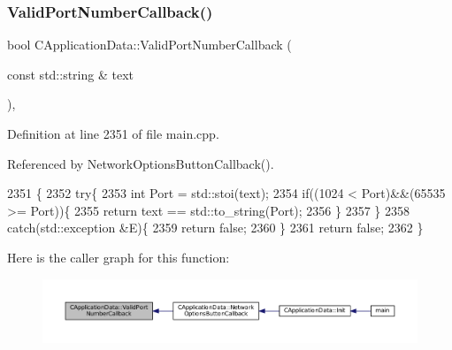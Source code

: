 \subsubsection{\texorpdfstring{Valid\+Port\+Number\+Callback()}{ValidPortNumberCallback()}}
{\footnotesize\ttfamily bool C\+Application\+Data\+::\+Valid\+Port\+Number\+Callback (\begin{DoxyParamCaption}\item[{const std\+::string \&}]{text }\end{DoxyParamCaption})\hspace{0.3cm}{\ttfamily [static]}, {\ttfamily [protected]}}



Definition at line 2351 of file main.\+cpp.



Referenced by Network\+Options\+Button\+Callback().


\begin{DoxyCode}
2351                                                                    \{
2352     \textcolor{keywordflow}{try}\{
2353         \textcolor{keywordtype}{int} Port = std::stoi(text);
2354         \textcolor{keywordflow}{if}((1024 < Port)&&(65535 >= Port))\{
2355             \textcolor{keywordflow}{return} text == std::to\_string(Port);
2356         \}
2357     \}
2358     \textcolor{keywordflow}{catch}(std::exception &E)\{
2359         \textcolor{keywordflow}{return} \textcolor{keyword}{false};
2360     \}
2361     \textcolor{keywordflow}{return} \textcolor{keyword}{false};
2362 \}
\end{DoxyCode}
Here is the caller graph for this function\+:\nopagebreak
\begin{figure}[H]
\begin{center}
\leavevmode
\includegraphics[width=350pt]{classCApplicationData_adc8125cc7c4ad01bdd43e6550c6ba133_icgraph}
\end{center}
\end{figure}
\hypertarget{classCApplicationData_ae3216a4fccd68c9657d7e936b1a6df67}{}\label{classCApplicationData_ae3216a4fccd68c9657d7e936b1a6df67} 
